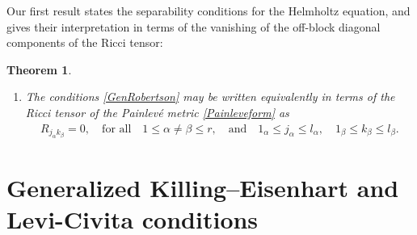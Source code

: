 \documentclass[11pt]{article}
\numberwithin{equation}{section}
\newtheorem{Theorem}{Theorem}[section]
\begin{document}
Our first result states the separability conditions for the Helmholtz equation, and gives their interpretation in terms of the vanishing of the off-block diagonal components of the Ricci tensor:


\setcounter{section}{1}
\setcounter{subsection}{0}
\setcounter{subsubsection}{0}
\setcounter{Theorem}{3}
\setcounter{equation}{24}
\begin{Theorem}\label{maintheorem1}\quad
\begin{enumerate}\itemsep=0pt

\setcounter{section}{1}
\setcounter{subsection}{0}
\setcounter{subsubsection}{0}
\setcounter{Theorem}{4}
\setcounter{equation}{26}
\item[$2)$] The conditions \eqref{GenRobertson} may be written equivalently in terms of the Ricci tensor of the Painlev\'e metric \eqref{Painleveform} as
\begin{gather}\label{Ricciform}
R_{j_{\alpha}k_{\beta}}=0, \quad {\mbox{for all}} \quad 1\leq \alpha \neq \beta \leq r, \quad {\mbox{and}} \quad 1_{\alpha}\leq j_{\alpha} \leq l_{\alpha}, \quad 1_{\beta}\leq k_{\beta}\leq l_{\beta}.
\end{gather}
\end{enumerate}
\end{Theorem}

\setcounter{section}{2}
\setcounter{subsection}{0}
\setcounter{subsubsection}{0}
\setcounter{Theorem}{5}
\setcounter{equation}{5}
\section{Generalized Killing--Eisenhart and Levi-Civita conditions}
\end{document}
